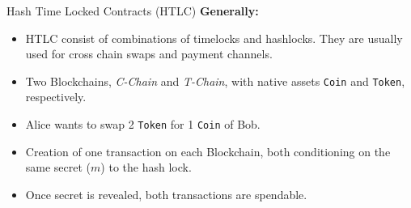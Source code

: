 \documentclass[handout]{beamer}
\begin{document}
\begin{frame}{Hash Time Locked Contracts (HTLC)}
	\textbf{Generally:}
	\begin{itemize}
		\item<1 -> HTLC consist of combinations of timelocks and hashlocks. They are usually used for cross chain swaps and payment channels.
	\end{itemize}
	\vspace{0.5cm}
	\begin{itemize}
		\item<2 -> Two Blockchains, \textit{C-Chain} and \textit{T-Chain}, with native assets \texttt{Coin} and \texttt{Token}, respectively. 
		\item<3 -> Alice wants to swap 2 \texttt{Token} for 1 \texttt{Coin} of Bob.
		\item<4 -> Creation of one transaction on each Blockchain, both conditioning on the same secret ($m$) to the hash lock.
		\item<5 -> Once secret is revealed, both transactions are spendable.
	\end{itemize}
\end{frame}

\end{document}
